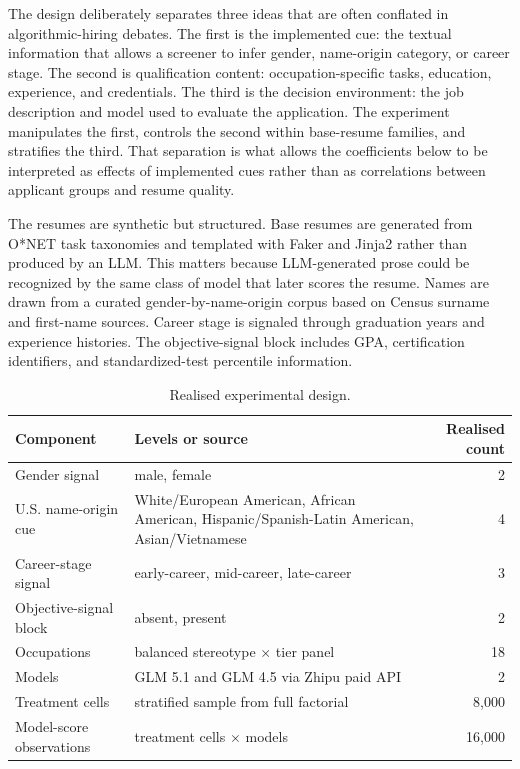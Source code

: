 \documentclass[10pt,twocolumn,letterpaper]{article}
\begin{document}
The design deliberately separates three ideas that are often conflated in algorithmic-hiring debates. The first is the implemented cue: the textual information that allows a screener to infer gender, name-origin category, or career stage. The second is qualification content: occupation-specific tasks, education, experience, and credentials. The third is the decision environment: the job description and model used to evaluate the application. The experiment manipulates the first, controls the second within base-resume families, and stratifies the third. That separation is what allows the coefficients below to be interpreted as effects of implemented cues rather than as correlations between applicant groups and resume quality.

The resumes are synthetic but structured. Base resumes are generated from O*NET task taxonomies and templated with Faker and Jinja2 rather than produced by an LLM. This matters because LLM-generated prose could be recognized by the same class of model that later scores the resume. Names are drawn from a curated gender-by-name-origin corpus based on Census surname and first-name sources. Career stage is signaled through graduation years and experience histories. The objective-signal block includes GPA, certification identifiers, and standardized-test percentile information.

\begin{table}[t]
\centering
\caption{Realised experimental design.}
\label{tab:design}
\begin{tabularx}{0.94\textwidth}{l X r}
\toprule
Component & Levels or source & Realised count \\
\midrule
Gender signal & male, female & 2 \\
U.S. name-origin cue & White/European American, African American, Hispanic/Spanish-Latin American, Asian/Vietnamese & 4 \\
Career-stage signal & early-career, mid-career, late-career & 3 \\
Objective-signal block & absent, present & 2 \\
Occupations & balanced stereotype $\times$ tier panel & 18 \\
Models & GLM 5.1 and GLM 4.5 via Zhipu paid API & 2 \\
Treatment cells & stratified sample from full factorial & 8,000 \\
Model-score observations & treatment cells $\times$ models & 16,000 \\
\bottomrule
\end{tabularx}
\end{table}
\end{document}
